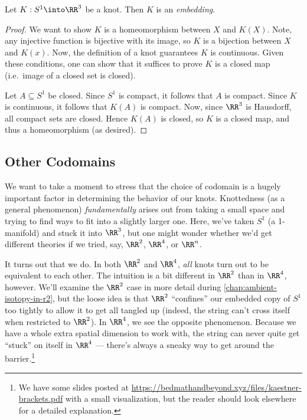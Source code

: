 \begin{proposition}\label{prop:knots-are-embeddings}
  Let $K : S^1 \into \RR^3$ be a knot. Then $K$ is an
  \emph{embedding}.
\end{proposition}
\begin{proof}

  We want to show $K$ is a homeomorphism between $X$ and $K(X)$. Note,
  any injective function is bijective with its image, so $K$ is a
  bijection between $X$ and $K(x)$. Now, the definition of a knot
  guarantees $K$ is continuous. Given these conditions, one can show
  that it suffices to prove $K$ is a closed map (i.e.\ image of a
  closed set is closed).

  Let $A \subseteq S^1$ be closed. Since $S^1$ is compact, it follows
  that $A$ is compact. Since $K$ is continuous, it follows that $K(A)$
  is compact. Now, since $\RR^3$ is Hausdorff, all compact sets are
  closed. Hence $K(A)$ is closed, so $K$ is a closed map, and thus a
  homeomorphism (as desired).
\end{proof}

\subsection{Other Codomains}
We want to take a moment to stress that the choice of codomain is a
hugely important factor in determining the behavior of our knots.
Knottedness (as a general phenomenon) \emph{fundamentally} arises out
from taking a small space and trying to find ways to fit into a
slightly larger one. Here, we've taken $S^1$ (a 1-manifold) and stuck
it into $\RR^3$, but one might wonder whether we'd get different
theories if we tried, say, $\RR^2$, $\RR^4$, or $\RR^n$.

It turns out that we do. In both $\RR^2$ and $\RR^4$, \emph{all} knots
turn out to be equivalent to each other. The intuition is a bit
different in $\RR^2$ than in $\RR^4$, however. We'll examine the
$\RR^2$ case in more detail during \cref{chap:ambient-isotopy-in-r2},
but the loose idea is that $\RR^2$ ``confines'' our embedded copy of
$S^1$ too tightly to allow it to get all tangled up (indeed, the
string can't cross itself when restricted to $\RR^2$). In $\RR^4$, we
see the opposite phenomenon. Because we have a whole extra spatial
dimension to work with, the string can never quite get ``stuck'' on
itself in $\RR^4$ --- there's always a sneaky way to get around the
barrier.\footnote{We have some slides posted at
  \url{https://bedmathandbeyond.xyz/files/kaestner-brackets.pdf} with
  a small visualization, but the reader should look elsewhere for a
  detailed explanation.}

